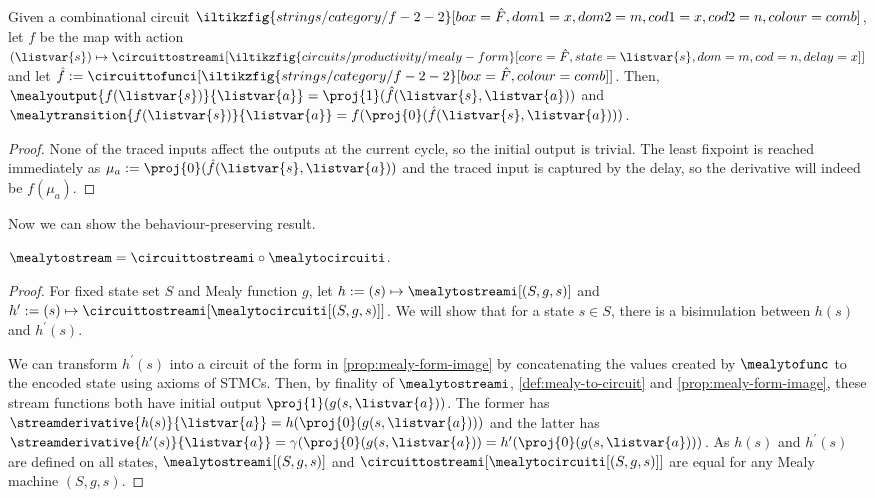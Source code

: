 \begin{proposition}
    \label{prop:mealy-form-image}
    Given a combinational circuit \(
        \iltikzfig{strings/category/f-2-2}[box=\hat{F},dom1=x,dom2=m,cod1=x,cod2=n,colour=comb]
    \), let \(f\) be the map with action \(
        (\listvar{s}) \mapsto
            \circuittostreami[
                \iltikzfig{circuits/productivity/mealy-form}[core=\hat{F},state=\listvar{s},dom=m,cod=n,delay=x]
            ]
    \) and let \(
        \hat{f}
        :=
        \circuittofunci[
            \iltikzfig{strings/category/f-2-2}[box=\hat{F},colour=comb]
        ]
    \).
    Then, \(
        \mealyoutput{f(\listvar{s})}{\listvar{a}}
        =
        \proj{1}(\hat{f}(\listvar{s}, \listvar{a}))
    \) and \(
        \mealytransition{f(\listvar{s})}{\listvar{a}}
        =
        f(\proj{0}(\hat{f}(\listvar{s}, \listvar{a})))
    \).
\end{proposition}
\begin{proof}
    None of the traced inputs affect the outputs at the
    current cycle, so the initial output is trivial.
    The least fixpoint is reached immediately as \(
        \mu_a := \proj{0}(\hat{f}(\listvar{s}, \listvar{a}))
    \) and the traced input is captured by the delay, so the derivative
    will indeed be \(f(\mu_a)\).
\end{proof}

Now we can show the behaviour-preserving result.

\begin{theorem}\label{thm:mealy-to-circuit}
    \(
        \mealytostream = \circuittostreami \circ \mealytocircuiti
    \).
\end{theorem}
\begin{proof}
    For fixed state set \(S\) and Mealy function \(g\), let
    \(h := (s) \mapsto \mealytostreami[(S, g, s)]\) and \(
        h^\prime := (s) \mapsto \circuittostreami[\mealytocircuiti[(S, g, s)]]
    \).
    We will show that for a state \(s \in S\), there is a bisimulation
    between \(h(s)\) and \(h^\prime(s)\).

    We can transform \(h^\prime(s)\) into a circuit of the form in
    \cref{prop:mealy-form-image} by concatenating the values created by
    \(\mealytofunc\) to the encoded state using axioms of STMCs.
    Then, by finality of \(\mealytostreami\), \cref{def:mealy-to-circuit} and
    \cref{prop:mealy-form-image}, these stream functions both have initial output \(
        \proj{1}(g(s, \listvar{a}))
    \).
    The former has \(
        \streamderivative{h(s)}{\listvar{a}} = h(\proj{0}(g(s, \listvar{a})))
    \) and the latter has \(
        \streamderivative{h^\prime(s)}{\listvar{a}} =
            \gamma(\proj{0}(g(s, \listvar{a})) =
            h^\prime(\proj{0}(g(s, \listvar{a})))
    \).
    As \(h(s)\) and \(h^\prime(s)\) are defined on all states,
    \(\mealytostreami[(S, g, s)]\) and
    \(\circuittostreami[\mealytocircuiti[(S, g, s)]]\) are equal for any Mealy
    machine \((S, g, s)\).
\end{proof}


